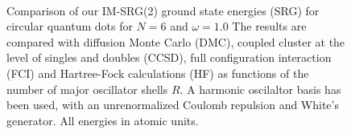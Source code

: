 \documentclass[amsmath, amssymb, aps, floatfix, nofootinbib, preprintnumbers,showpacs, superscriptaddress, twocolumn]{revtex4-1}
\begin{document}
\begin{figure}%
     \begin{center}
        \\ %
    \end{center}
    \caption{Comparison of our IM-SRG(2) ground state energies (SRG)
      for circular quantum dots for $N=6$ and $\omega=1.0$
       The results are compared with diffusion Monte Carlo (DMC),
      coupled cluster at the level of singles and doubles (CCSD), full
      configuration interaction (FCI) and Hartree-Fock calculations
      (HF) as functions of the number of major oscillator shells
      $R$. A harmonic oscilaltor basis has been used, with an
      unrenormalized Coulomb repulsion and White's generator. All
      energies in atomic units.}
   \label{fig:N6}
\end{figure}
\end{document}
